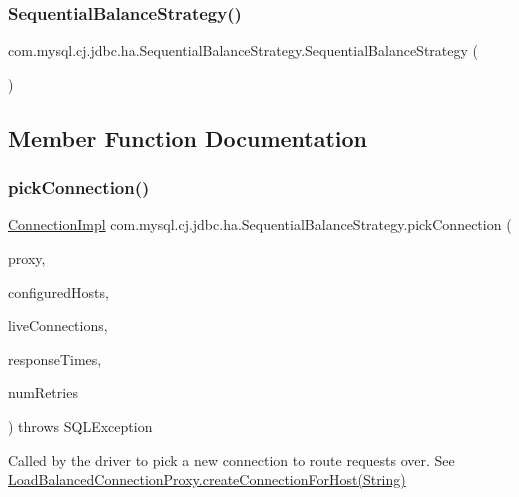 \subsubsection{\texorpdfstring{Sequential\+Balance\+Strategy()}{SequentialBalanceStrategy()}}
{\footnotesize\ttfamily com.\+mysql.\+cj.\+jdbc.\+ha.\+Sequential\+Balance\+Strategy.\+Sequential\+Balance\+Strategy (\begin{DoxyParamCaption}{ }\end{DoxyParamCaption})}



\subsection{Member Function Documentation}
\mbox{\label{classcom_1_1mysql_1_1cj_1_1jdbc_1_1ha_1_1_sequential_balance_strategy_a2fb26910a5b3161faa35e0264d5c7adc}} 
\subsubsection{\texorpdfstring{pick\+Connection()}{pickConnection()}}
{\footnotesize\ttfamily \mbox{\hyperlink{classcom_1_1mysql_1_1cj_1_1jdbc_1_1_connection_impl}{Connection\+Impl}} com.\+mysql.\+cj.\+jdbc.\+ha.\+Sequential\+Balance\+Strategy.\+pick\+Connection (\begin{DoxyParamCaption}\item[{Invocation\+Handler}]{proxy,  }\item[{List$<$ String $>$}]{configured\+Hosts,  }\item[{Map$<$ String, \mbox{\hyperlink{interfacecom_1_1mysql_1_1cj_1_1jdbc_1_1_jdbc_connection}{Jdbc\+Connection}} $>$}]{live\+Connections,  }\item[{long \mbox{[}$\,$\mbox{]}}]{response\+Times,  }\item[{int}]{num\+Retries }\end{DoxyParamCaption}) throws S\+Q\+L\+Exception}

Called by the driver to pick a new connection to route requests over. See \mbox{\hyperlink{classcom_1_1mysql_1_1cj_1_1jdbc_1_1ha_1_1_load_balanced_connection_proxy_a27662d65e82acb86f3cc6af3f4f331ee}{Load\+Balanced\+Connection\+Proxy.\+create\+Connection\+For\+Host(\+String)}}


